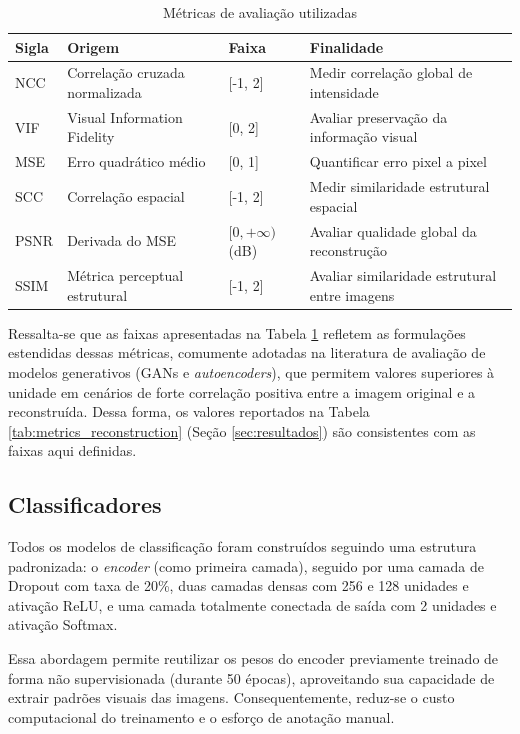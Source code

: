 \documentclass{article}
\begin{document}
\begin{table}[!h]
\centering
\caption{Métricas de avaliação utilizadas}
\label{tab:metricas_avaliacao}
\begin{tabular}{llll}
\toprule
\textbf{Sigla} & \textbf{Origem} & \textbf{Faixa} & \textbf{Finalidade} \\
\midrule
NCC   & Correlação cruzada normalizada & [-1, 2] & Medir correlação global de intensidade \\
VIF   & Visual Information Fidelity & [0, 2] & Avaliar preservação da informação visual \\
MSE   & Erro quadrático médio & [0, 1] & Quantificar erro pixel a pixel \\
SCC   & Correlação espacial & [-1, 2] & Medir similaridade estrutural espacial \\
PSNR  & Derivada do MSE & $[0, +\infty)$ (dB) & Avaliar qualidade global da reconstrução \\
SSIM  & Métrica perceptual estrutural & [-1, 2] & Avaliar similaridade estrutural entre imagens \\
\bottomrule
\end{tabular}
\end{table}

Ressalta-se que as faixas apresentadas na Tabela \ref{tab:metricas_avaliacao} refletem as formulações estendidas dessas métricas, comumente adotadas na literatura de avaliação de modelos generativos (GANs e \textit{autoencoders}), que permitem valores superiores à unidade em cenários de forte correlação positiva entre a imagem original e a reconstruída. Dessa forma, os valores reportados na Tabela \ref{tab:metrics_reconstruction} (Seção \ref{sec:resultados}) são consistentes com as faixas aqui definidas.

\subsection{Classificadores}\label{subsec:classificadores}

Todos os modelos de classificação foram construídos seguindo uma estrutura padronizada: o \textit{encoder} (como primeira camada), seguido por uma camada de Dropout com taxa de 20\%, duas camadas densas com 256 e 128 unidades e ativação ReLU, e uma camada totalmente conectada de saída com 2 unidades e ativação Softmax.

Essa abordagem permite reutilizar os pesos do encoder previamente treinado de forma não supervisionada (durante 50 épocas), aproveitando sua capacidade de extrair padrões visuais das imagens. Consequentemente, reduz-se o custo computacional do treinamento e o esforço de anotação manual.
\end{document}
